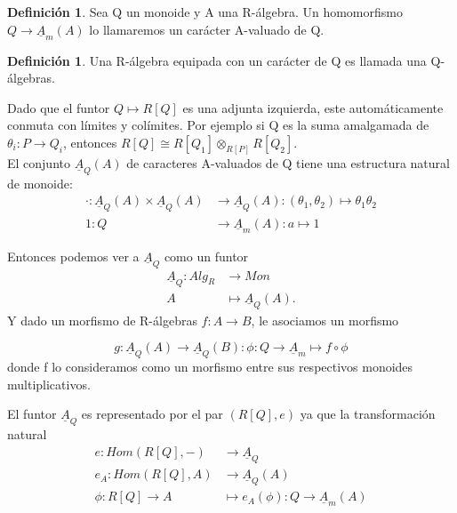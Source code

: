 \documentclass[12pt,spanish]{amsart}
\theoremstyle{definition}
\newtheorem{Def}[Theorem]{Definición}
\theoremstyle{remark}
\begin{document}
\begin{Def}
Sea Q un monoide y A una R-álgebra. Un homomorfismo $Q \to \underline{A}_{m}(A)$ lo llamaremos un carácter A-valuado de Q. 
\end{Def}

\begin{Def}
Una R-álgebra equipada con un carácter de Q es llamada una Q-álgebras. 
\end{Def}

Dado que el funtor $Q \mapsto R[Q]$ es una adjunta izquierda, este automáticamente conmuta con límites y colímites. Por ejemplo si Q es la suma amalgamada de $\theta_{i}:P \to Q_{i}$, entonces $R[Q]\cong R[Q_{1}]\otimes_{R[P]}R[Q_{2}]$. \\

El conjunto $\underline{A}_{Q}(A)$ de caracteres A-valuados de Q tiene una estructura natural de monoide:
\begin{equation*}
\begin{split}
\cdot: \underline{A}_{Q}(A)\times \underline{A}_{Q}(A) &\to \underline{A}_{Q}(A): (\theta_{1},\theta_{2}) \mapsto \theta_{1}\theta_{2} \\
1:Q &\to \underline{A}_{m}(A):a \mapsto 1 
\end{split}
\end{equation*}

Entonces podemos ver a $\underline{A}_{Q}$ como un funtor
\begin{equation*}
\begin{split}
\underline{A}_{Q}:Alg_{R} &\to Mon \\
A &\mapsto \underline{A}_{Q}(A).
\end{split}    
\end{equation*}
Y dado un morfismo de R-álgebras $f:A \to B$, le asociamos un morfismo

$$g:\underline{A}_{Q}(A) \to \underline{A}_{Q}(B):\phi:Q \to \underline{A}_{m} \mapsto f \circ \phi$$  
donde f lo consideramos como un morfismo entre sus respectivos monoides multiplicativos. 

El funtor $\underline{A}_{Q}$ es representado por el par $(R[Q],e)$ ya que la transformación natural
\begin{equation*}
\begin{split}
e:Hom(R[Q],-) &\to \underline{A}_{Q} \\
e_{A}:Hom(R[Q],A) &\to \underline{A}_{Q}(A) \\
\phi:R[Q] \to A &\mapsto e_{A}(\phi):Q \to \underline{A}_{m}(A)
\end{split}
\end{equation*}
\end{document}
